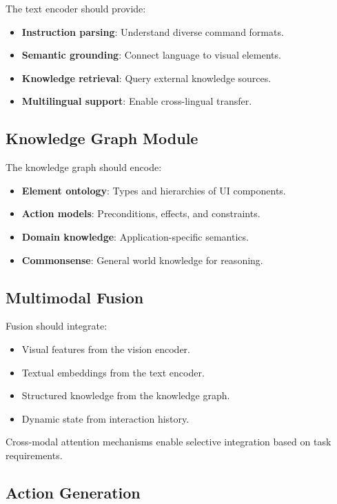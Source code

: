 \documentclass[11pt]{article}
\begin{document}
The text encoder should provide:

\begin{itemize}
    \item \textbf{Instruction parsing}: Understand diverse command formats.
    \item \textbf{Semantic grounding}: Connect language to visual elements.
    \item \textbf{Knowledge retrieval}: Query external knowledge sources.
    \item \textbf{Multilingual support}: Enable cross-lingual transfer.
\end{itemize}

\subsection{Knowledge Graph Module}

The knowledge graph should encode:

\begin{itemize}
    \item \textbf{Element ontology}: Types and hierarchies of UI components.
    \item \textbf{Action models}: Preconditions, effects, and constraints.
    \item \textbf{Domain knowledge}: Application-specific semantics.
    \item \textbf{Commonsense}: General world knowledge for reasoning.
\end{itemize}

\subsection{Multimodal Fusion}

Fusion should integrate:

\begin{itemize}
    \item Visual features from the vision encoder.
    \item Textual embeddings from the text encoder.
    \item Structured knowledge from the knowledge graph.
    \item Dynamic state from interaction history.
\end{itemize}

Cross-modal attention mechanisms enable selective integration based on task requirements.

\subsection{Action Generation}
\end{document}

